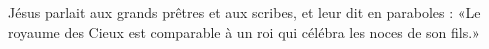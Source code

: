 \encetemps Jésus parlait aux grands prêtres et aux scribes,
	et leur dit en paraboles :
	«Le royaume des Cieux est comparable à un roi
	qui célébra les noces de son fils.»
